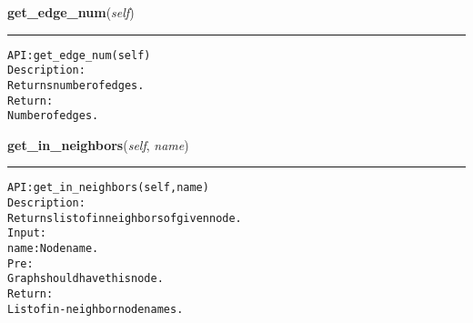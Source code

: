     \label{coinor:gimpy:graph:Graph:get_edge_num}

    \vspace{0.5ex}

\hspace{.8\funcindent}\begin{boxedminipage}{\funcwidth}

    \raggedright \textbf{get\_edge\_num}(\textit{self})

    \vspace{-1.5ex}

    \rule{\textwidth}{0.5\fboxrule}
\setlength{\parskip}{2ex}
\begin{alltt}

API: get\_edge\_num(self)
Description:
Returns number of edges.
Return:
    Number of edges.
\end{alltt}

\setlength{\parskip}{1ex}
    \end{boxedminipage}

    \label{coinor:gimpy:graph:Graph:get_in_neighbors}

    \vspace{0.5ex}

\hspace{.8\funcindent}\begin{boxedminipage}{\funcwidth}

    \raggedright \textbf{get\_in\_neighbors}(\textit{self}, \textit{name})

    \vspace{-1.5ex}

    \rule{\textwidth}{0.5\fboxrule}
\setlength{\parskip}{2ex}
\begin{alltt}

API: get\_in\_neighbors(self, name)
Description:
Returns list of in neighbors of given node.
Input:
    name: Node name.
Pre:
    Graph should have this node.
Return:
    List of in-neighbor node names.
\end{alltt}

\setlength{\parskip}{1ex}
    \end{boxedminipage}

